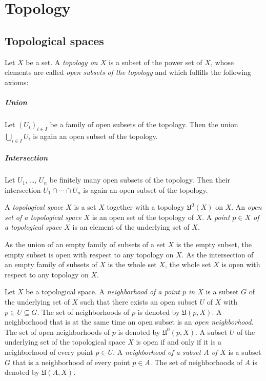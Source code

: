 \chapter{Topology}

\section{Topological spaces}
\label{sec:topological_spaces}

\begin{dfn}
  Let $X$ be a set. A \emph{topology on $X$} is a subset of the
  power set of $X$, whose elements are called \emph{open subsets of the topology}
  and which fulfills the following axioms:
  
  \paragraph{Union}
  Let $(U_i)_{i \in I}$ be a family of open subsets of the topology. Then the
  union $\bigcup_{i \in I} U_i$ is again an open subset of the topology.
  
  \paragraph{Intersection}
  Let $U_1$, \dots, $U_n$ be finitely many open subsets of the topology. Then
  their intersection $U_1 \cap \dotsb \cap U_n$
  is again an open subset of the topology.
  
  A \emph{topological space $X$} is a set $X$ together with a topology $\mathfrak U^0(X)$
  on $X$. An \emph{open set of a topological space $X$} is an open set of the topology
  of $X$.
  A \emph{point $p \in X$ of a topological space $X$} is an element of the
  underlying set of $X$.
\end{dfn}

As the union of an empty family of subsets of a set $X$ is the empty subset,
the empty subset is open with respect to any topology on $X$.
As the intersection of an empty family of subsets of $X$ is the whole set $X$,
the whole set $X$ is open with respect to any topology on $X$.

Let $X$ be a topological space.
A \emph{neighborhood of a point $p$ in $X$} is a subset $G$
of the underlying set of $X$ such that there exists an open subset $U$ of $X$ with
$p \in U \subseteq G$. The set of neighborhoods of $p$ is denoted by
$\mathfrak U(p, X)$. A neighborhood that is at the same time an open subset
is an \emph{open neighborhood}. The set of open neighborhoods of $p$ is
denoted by $\mathfrak U^0(p, X)$. A subset $U$ of the underlying set of the
topological space $X$ is open if and only if it is a neighborhood of every point
$p \in U$. A \emph{neighborhood of a subset $A$ of $X$} is a subset $G$ that is
a neighborhood of every point $p \in A$. The set of neighborhoods of $A$ is denoted
by $\mathfrak U(A, X)$.

